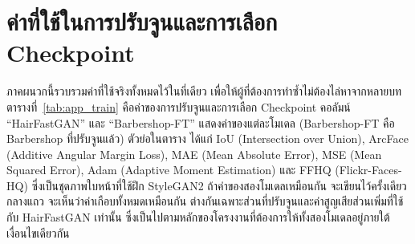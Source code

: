 \appendiceschapter{}
\setcounter{chapter}{-1}

\label{app:settings}

\renewcommand{\thesection}{ก.\arabic{section}}
\setcounter{section}{0}

\section{ค่าที่ใช้ในการปรับจูนและการเลือก Checkpoint}

ภาคผนวกนี้รวบรวมค่าที่ใช้จริงทั้งหมดไว้ในที่เดียว เพื่อให้ผู้ที่ต้องการทำซ้ำไม่ต้องไล่หาจากหลายบท
ตารางที่~\ref{tab:app_train} คือค่าของการปรับจูนและการเลือก Checkpoint
คอลัมน์ ``HairFastGAN'' และ ``Barbershop-FT'' แสดงค่าของแต่ละโมเดล
(Barbershop-FT คือ Barbershop ที่ปรับจูนแล้ว)
ตัวย่อในตาราง ได้แก่ IoU (Intersection over Union), ArcFace (Additive Angular Margin Loss),
MAE (Mean Absolute Error), MSE (Mean Squared Error), Adam (Adaptive Moment Estimation)
และ FFHQ (Flickr-Faces-HQ) ซึ่งเป็นชุดภาพใบหน้าที่ใช้ฝึก StyleGAN2
ถ้าค่าของสองโมเดลเหมือนกัน จะเขียนไว้ครั้งเดียวกลางแถว
จะเห็นว่าค่าเกือบทั้งหมดเหมือนกัน ต่างกันเฉพาะส่วนที่ปรับจูนและค่าสูญเสียส่วนเพิ่มที่ใช้กับ HairFastGAN เท่านั้น
ซึ่งเป็นไปตามหลักของโครงงานที่ต้องการให้ทั้งสองโมเดลอยู่ภายใต้เงื่อนไขเดียวกัน

